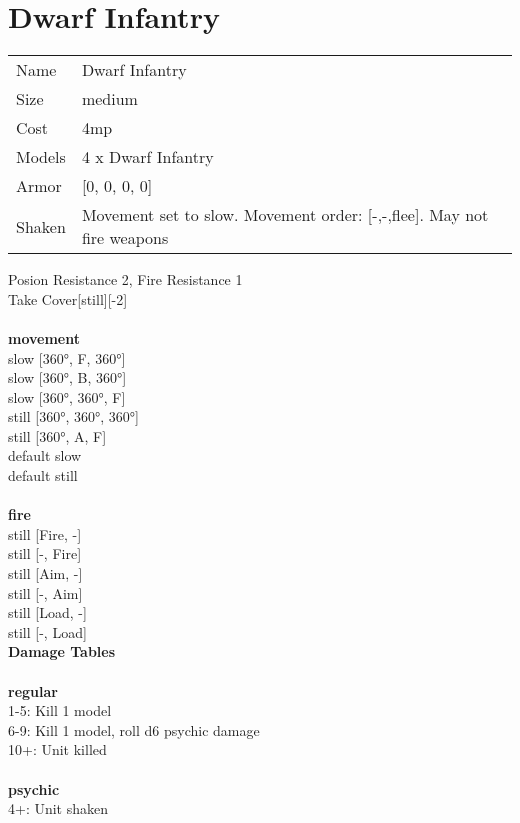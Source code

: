 \clearpage

\section{ Dwarf Infantry }

\begin{tabular}{ll}
  Name & Dwarf Infantry \\
  Size & medium\\
  Cost & 4mp\\
  Models & 4 x Dwarf Infantry\\
  Armor & [0, 0, 0, 0]\\
  Shaken & Movement set to slow. Movement order: [-,-,flee]. May not fire weapons\\
\end{tabular}

\noindent Posion Resistance 2, Fire Resistance 1\\ 
Take Cover[still][-2]\\ 


\ \\ {\bf movement } \\
slow [360°, F, 360°] \\
slow [360°, B, 360°] \\
slow [360°, 360°, F] \\
still [360°, 360°, 360°] \\
still [360°, A, F] \\
default slow \\
default still \\
\ \\ {\bf fire } \\
still [Fire, -] \\
still [-, Fire] \\
still [Aim, -] \\
still [-, Aim] \\
still [Load, -] \\
still [-, Load] \\


{\bf Damage Tables} \\
\ \\ {\bf regular } \\
1-5: Kill 1 model \\
6-9: Kill 1 model, roll d6 psychic damage \\
10+: Unit killed \\
\ \\ {\bf psychic } \\
4+: Unit shaken \\


